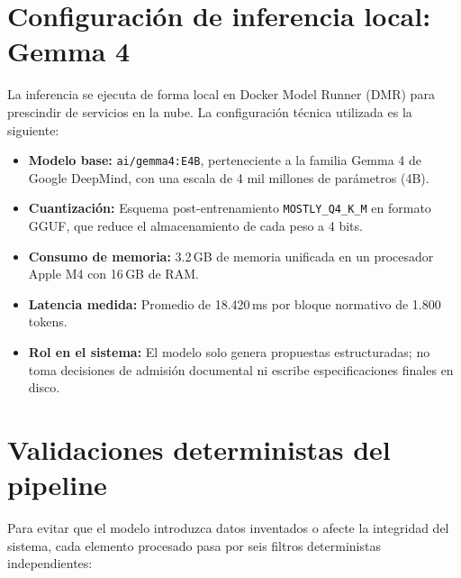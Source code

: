 \documentclass[11pt,a4paper]{article}
\begin{document}
\section{Configuración de inferencia local: Gemma 4}

La inferencia se ejecuta de forma local en Docker Model Runner (DMR) para prescindir de servicios en la nube. La configuración técnica utilizada es la siguiente:

\begin{itemize}[leftmargin=*]
    \item \textbf{Modelo base:} \texttt{ai/gemma4:E4B}, perteneciente a la familia Gemma 4 de Google DeepMind, con una escala de 4 mil millones de parámetros (4B).
    \item \textbf{Cuantización:} Esquema post-entrenamiento \texttt{MOSTLY\_Q4\_K\_M} en formato GGUF, que reduce el almacenamiento de cada peso a 4 bits.
    \item \textbf{Consumo de memoria:} 3.2\,GB de memoria unificada en un procesador Apple M4 con 16\,GB de RAM.
    \item \textbf{Latencia medida:} Promedio de 18.420\,ms por bloque normativo de 1.800 tokens.
    \item \textbf{Rol en el sistema:} El modelo solo genera propuestas estructuradas; no toma decisiones de admisión documental ni escribe especificaciones finales en disco.
\end{itemize}

\section{Validaciones deterministas del pipeline}

Para evitar que el modelo introduzca datos inventados o afecte la integridad del sistema, cada elemento procesado pasa por seis filtros deterministas independientes:
\end{document}
